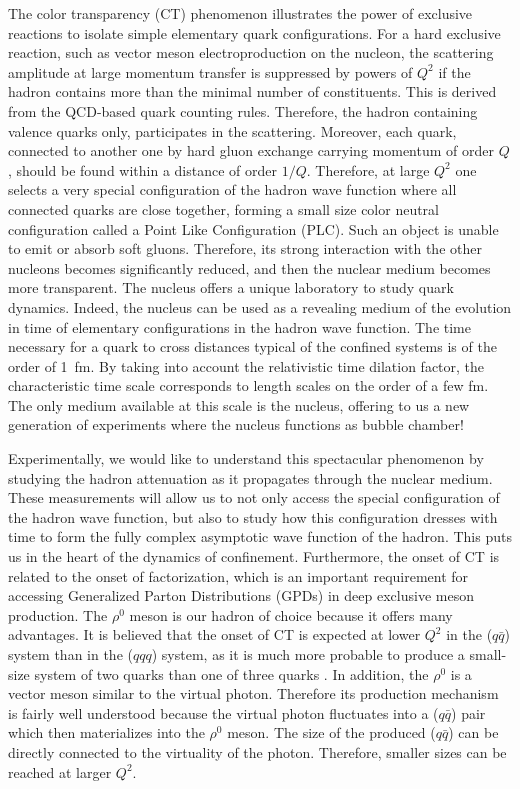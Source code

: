 The color transparency (CT) phenomenon illustrates the power of exclusive 
reactions to isolate simple elementary quark configurations.  For a hard 
exclusive reaction, such as vector meson electroproduction on the nucleon, 
the scattering amplitude at large momentum transfer is suppressed by 
powers of $Q^2$ if the hadron contains more than the minimal number of 
constituents.  This is derived from the QCD-based quark counting rules. 
Therefore, the hadron containing valence quarks only, participates in the 
scattering.  Moreover, each quark, connected to another one by hard gluon 
exchange carrying momentum of order $Q$, should be found within a distance 
of order $1/Q$. Therefore, at large $Q^2$ one selects a very special 
configuration of the hadron wave function where all connected quarks are 
close together, forming a small size color neutral configuration called 
a Point Like Configuration (PLC).  Such an object is unable to emit or 
absorb soft gluons.  Therefore, its strong interaction with the other 
nucleons becomes significantly reduced, and then the nuclear medium 
becomes more transparent.  The nucleus offers a unique laboratory to study 
quark dynamics.  Indeed, the nucleus can be used as a revealing medium of 
the evolution in time of elementary configurations in the hadron wave 
function.  The time necessary for a quark to cross distances typical of 
the confined systems is of the order of 1~fm.  By taking into account the 
relativistic time dilation factor, the characteristic time scale 
corresponds to length scales on the order of a few fm.  The only medium 
available at this scale is the nucleus, offering to us a new generation of 
experiments where the nucleus functions as bubble chamber!

Experimentally, we would like to understand this spectacular phenomenon by 
studying the hadron attenuation as it propagates through the nuclear 
medium.  These measurements will allow us to not only access the special 
configuration of the hadron wave function, but also to study how this 
configuration dresses with time to form the fully complex asymptotic wave 
function of the hadron.  This puts us in the heart of the dynamics of 
confinement.  Furthermore, the onset of CT is related to the onset of 
factorization, which is an important requirement for accessing Generalized 
Parton Distributions (GPDs) in deep exclusive meson production. The 
$\rho^0$ meson is our hadron of choice because it offers many advantages. 
It is believed that the onset of CT is expected at lower $Q^2$ in the 
($q\bar{q}$) system than in the ($qqq$) system, as it is much more probable 
to produce a small-size system of two quarks than one of three quarks
\cite{Blat}.  In addition, the $\rho^0$ is a vector meson similar to 
the virtual photon. Therefore its production mechanism is fairly well 
understood because the virtual photon fluctuates into a ($q\bar{q}$) pair 
which then materializes into the $\rho^0$ meson. The size of the 
produced ($q\bar{q}$) can be directly connected to the virtuality of the 
photon. Therefore, smaller sizes can be reached at larger $Q^2$.

